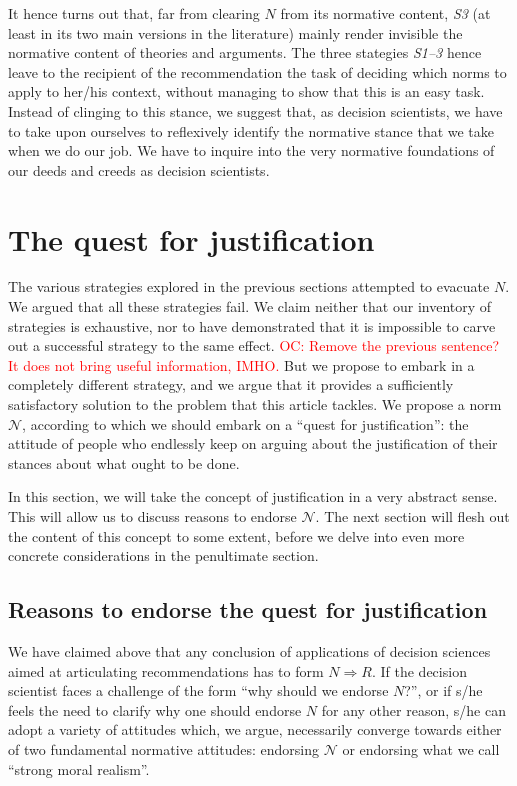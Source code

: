 \documentclass[preprint, french, english, 11pt, authoryear]{elsarticle}%
\newcommand{\commentOC}[1]{\textcolor{red}{OC: #1}}
\newcommand{\adv}{\mathscr{N}}
\begin{document}
It hence turns out that, far from clearing $N$ from its normative content, \emph{S3} (at least in its two main versions in the literature) mainly render invisible the normative content of theories and arguments. The three stategies \emph{S1--3} hence leave to the recipient of the recommendation the task of deciding which norms to apply to her/his context, without managing to show that this is an easy task. 
Instead of clinging to this stance, we suggest that, as decision scientists, we have to take upon ourselves to reflexively identify the normative stance that we take when we do our job. We have to inquire into the very normative foundations of our deeds and creeds as decision scientists. 

\section{The quest for justification}
The various strategies explored in the previous sections attempted to evacuate $N$. We argued that all these strategies fail. We claim neither that our inventory of strategies is exhaustive, nor to have demonstrated that it is impossible to carve out a successful strategy to the same effect. \commentOC{Remove the previous sentence? It does not bring useful information, IMHO.} But we propose to embark in a completely different strategy, and we argue that it provides a sufficiently satisfactory solution to the problem that this article tackles. We propose a norm $\adv$, according to which we should embark on a ``quest for justification'': the attitude of people who endlessly keep on arguing about the justification of their stances about what ought to be done.

In this section, we will take the concept of justification in a very abstract sense. This will allow us to discuss reasons to endorse $\adv$. The next section will flesh out the content of this concept to some extent, before we delve into even more concrete considerations in the penultimate section.

\subsection {Reasons to endorse the quest for justification}
We have claimed above that any conclusion of applications of decision sciences aimed at articulating recommendations has to form $N ⇒ R$. If the decision scientist faces a challenge of the form ``why should we endorse $N$?'', or if s/he feels the need to clarify why one should endorse $N$ for any other reason, s/he can adopt a variety of attitudes which, we argue, necessarily converge towards either of two fundamental normative attitudes: endorsing $\adv$ or endorsing what we call ``strong moral realism''.
\end{document}

